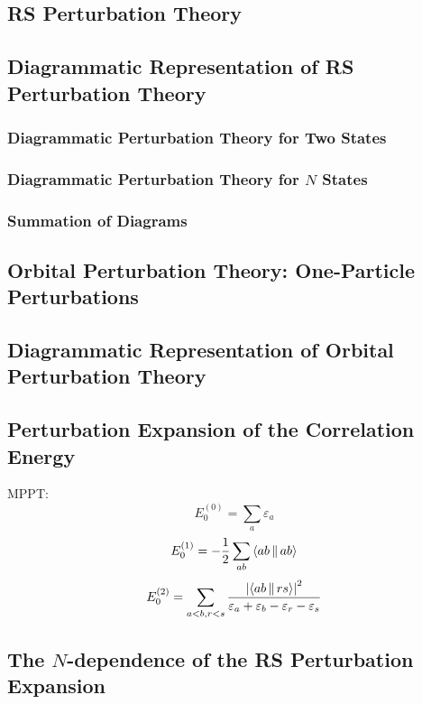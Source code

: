 \documentclass[a4paper]{article}
\numberwithin{equation}{section}
\begin{document}
\subsection{RS Perturbation Theory}

\subsection{Diagrammatic Representation of RS Perturbation Theory}
\subsubsection{Diagrammatic Perturbation Theory for Two States}
\subsubsection{Diagrammatic Perturbation Theory for $ N $ States}
\subsubsection{Summation of Diagrams}

\subsection{Orbital Perturbation Theory: One-Particle Perturbations}

\subsection{Diagrammatic Representation of Orbital Perturbation Theory}

\subsection{Perturbation Expansion of the Correlation Energy}
MPPT:
\begin{equation}\label{key}
E_0^{(0)} = \sum_a \varepsilon_a
\end{equation}
\begin{equation}\label{key}
E_0^{(1)} = -\dfrac{1}{2}\sum_{ab} \Braket{ab||ab}
\end{equation}
\begin{align}
E_0^{(2)} = %
\sum_{a<b,r<s} \dfrac{\abs{\Braket{ab||rs}}^2}{\varepsilon_a + \varepsilon_b - \varepsilon_r - \varepsilon_s}
\end{align}

\subsection{The $ N $-dependence of the RS Perturbation Expansion}
\end{document}
